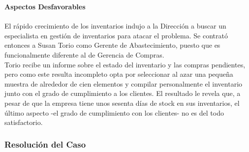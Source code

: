 \documentclass[a4paper,10pt,titlepage]{article}
\begin{document}
	\textbf{Aspectos Desfavorables}\\\\
		\indent El r\'apido crecimiento de los inventarios indujo a la Direcci\'on a buscar un especialista en gesti\'on de inventarios para atacar el problema. Se contrat\'o entonces a Susan Torio como Gerente de Abastecimiento, puesto que es funcionalmente diferente al de Gerencia de Compras.\\
		\indent Torio recibe un informe sobre el estado del inventario y las compras pendientes, pero como este resulta incompleto opta por seleccionar al azar una pequeña muestra de alrededor de cien elementos y compilar personalmente el inventario junto con el grado de cumplimiento a los clientes. El resultado le revela que, a pesar de que la empresa tiene unos sesenta d\'ias de stock en sus inventarios, el \'ultimo aspecto -el grado de cumplimiento con los clientes- no es del todo satisfactorio.\\

\newpage
\subsubsection{Resoluci\'on del Caso}
\end{document}
